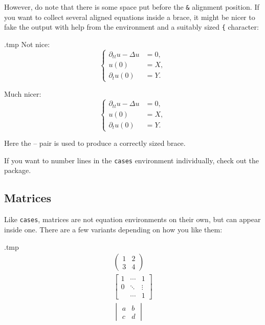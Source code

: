 However, do note that there is some space put before the \verb|&| alignment position.
If you want to collect several aligned equations inside a brace,
it might be nicer to fake the output with help from the  environment
and a suitably sized \verb|{| character:\label{ex:math equations in cases}
%
\begin{VerbatimOut}{\jobname.tmp}
Not nice:
\begin{equation}
\begin{cases}
    \partial_{tt} u - \Delta u &= 0,\\
    u(0) &= X,\\
    \partial_t u(0) &= Y.
\end{cases}
\end{equation}

Much nicer:
\begin{equation}
\left\{
\begin{aligned}
    \partial_{tt} u - \Delta u &= 0,\\
    u(0) &= X,\\
    \partial_t u(0) &= Y.
\end{aligned}
\right.
\end{equation}
\end{VerbatimOut}
\ShowExample
%
Here the -- pair is used to produce a correctly sized brace.



If you want to number lines in the \verb|cases| environment individually,
check out the  package.


%
%
\subsection{Matrices}

Like \verb|cases|, matrices are not equation environments on their own,
but can appear inside one.
There are a few variants depending on how you like them:
%
\begin{VerbatimOut}{\jobname.tmp}
\begin{gather*}
\begin{pmatrix}
    1 & 2\\
    3 & 4
\end{pmatrix}\\
\begin{bmatrix}
    1 & \cdots & 1\\
    0 & \ddots & \vdots\\
      & \cdots & 1
\end{bmatrix}\\
\begin{vmatrix}
    a & b\\
    c & d
\end{vmatrix}
\end{gather*}
\end{VerbatimOut}
\ShowExample




